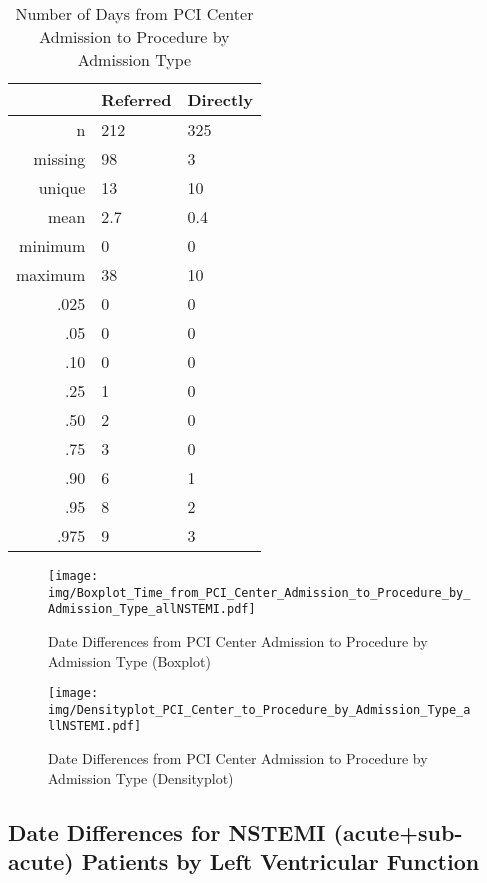 \documentclass[a4paper]{report}
\begin{document}
\begin{itemize}
{%
\begin{table}[ht]
\centering
\begin{tabular}{rll}
  \toprule
 & Referred & Directly \\ 
  \midrule
n & 212 & 325 \\ 
  missing & 98 & 3 \\ 
  unique & 13 & 10 \\ 
  mean & 2.7 & 0.4 \\ 
  minimum & 0 & 0 \\ 
  maximum & 38 & 10 \\ 
  .025 & 0 & 0 \\ 
  .05 & 0 & 0 \\ 
  .10 & 0 & 0 \\ 
  .25 & 1 & 0 \\ 
  .50 & 2 & 0 \\ 
  .75 & 3 & 0 \\ 
  .90 & 6 & 1 \\ 
  .95 & 8 & 2 \\ 
  .975 & 9 & 3 \\ 
   \bottomrule
\end{tabular}
\caption{Number of Days from PCI Center Admission to Procedure by Admission Type} 
\end{table}
\begin{figure}
  \centering
  \caption{Date Differences from PCI Center Admission to Procedure by Admission Type (Boxplot)}
  \label{Boxplot: Date Differences from PCI Center Admission to Procedure by Admission Type}
\texttt{[image: img/Boxplot\_Time\_from\_PCI\_Center\_Admission\_to\_Procedure\_by\_Admission\_Type\_allNSTEMI.pdf]}\end{figure}


\begin{figure}
  \centering
  \caption{Date Differences from PCI Center Admission to Procedure by Admission Type (Densityplot)}
  \label{Density: Date Differences from PCI Center Admission to Procedure by Admission Type}
\texttt{[image: img/Densityplot\_PCI\_Center\_to\_Procedure\_by\_Admission\_Type\_allNSTEMI.pdf]}\end{figure}







\clearpage
\subsection{Date Differences for NSTEMI (acute+sub-acute) Patients by Left Ventricular Function}

}
\end{itemize}
\end{document}
